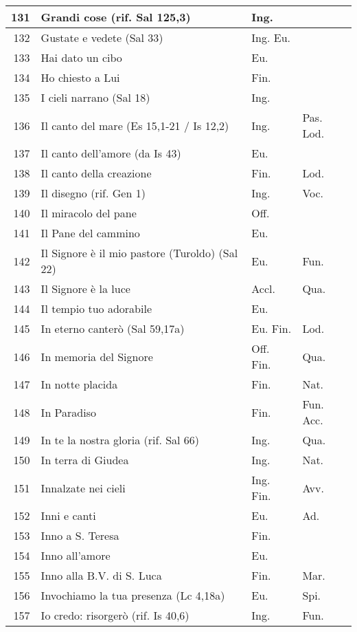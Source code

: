 {\begin{center}
\begin{longtable}{ | r | m{4.7cm} | m{1.8cm} | m{2cm}  |}
    131 & Grandi cose (rif. Sal 125,3) & Ing. & \\ \hline
    132 & Gustate e vedete (Sal 33) & Ing. Eu. & \\ \hline
    133 & Hai dato un cibo & Eu. & \\ \hline
    134 & Ho chiesto a Lui & Fin. & \\ \hline
    135 & I cieli narrano (Sal 18) & Ing. & \\ \hline
    136 & Il canto del mare (Es 15,1-21 / Is 12,2) & Ing. & Pas. Lod.\\ \hline
    137 & Il canto dell'amore (da Is 43) & Eu. & \\ \hline
    138 & Il canto della creazione & Fin. & Lod.\\ \hline
    139 & Il disegno (rif. Gen 1) & Ing. & Voc.\\ \hline
    140 & Il miracolo del pane & Off. & \\ \hline
    141 & Il Pane del cammino & Eu. & \\ \hline
    142 & Il Signore è il mio pastore (Turoldo) (Sal 22) & Eu. & Fun.\\ \hline
    143 & Il Signore è la luce & Accl. & Qua.\\ \hline
    144 & Il tempio tuo adorabile & Eu. & \\ \hline
    145 & In eterno canterò (Sal 59,17a) & Eu. Fin. & Lod.\\ \hline
    146 & In memoria del Signore & Off. Fin. & Qua.\\ \hline
    147 & In notte placida & Fin. & Nat.\\ \hline
    148 & In Paradiso & Fin. & Fun. Acc.\\ \hline
    149 & In te la nostra gloria (rif. Sal 66) & Ing. & Qua.\\ \hline
    150 & In terra di Giudea & Ing. & Nat.\\ \hline
    151 & Innalzate nei cieli & Ing. Fin. & Avv.\\ \hline
    152 & Inni e canti & Eu. & Ad.\\ \hline
    153 & Inno a S. Teresa & Fin. & \\ \hline
    154 & Inno all'amore & Eu. & \\ \hline
    155 & Inno alla B.V. di S. Luca & Fin. & Mar.\\ \hline
    156 & Invochiamo la tua presenza (Lc 4,18a) & Eu. & Spi.\\ \hline
    157 & Io credo: risorgerò (rif. Is 40,6) & Ing. & Fun.\\ \hline

\end{longtable}
\end{center}}
